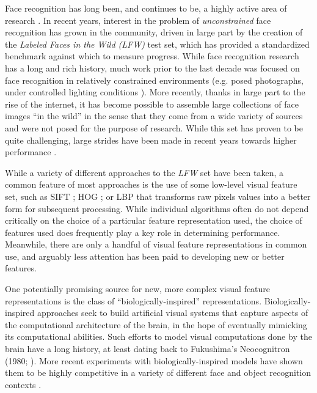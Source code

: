 Face recognition has long been, and continues to be, a highly active area of research \cite{belhumeur2002eigenfaces,yang2002kernel,vasilescu2002multilinear,zhao2003face,he2005face,hua2007face,hua2009robust,guillaumin2009you,hua2009robust,wright2009implicit,zou2007comparative}.
In recent years, interest in the problem of \emph{unconstrained} face
recognition has grown in the community, driven in large part by the creation of
the \emph{Labeled Faces in the Wild (LFW)} \cite{huang:lfw} test set, which has
provided a standardized benchmark against which to measure progress.  While
face recognition research  has a long and rich history, much
work prior to the last decade was focused on face recognition in relatively
constrained environments (e.g. posed photographs, under controlled  lighting
conditions \cite{orl,yale,cvl,ar,phillips2000feret,gross2009multi}).  More
recently, thanks in large part to the rise of the internet, it has become
possible to assemble large collections of face images ``in the wild'' in the
sense that they come from a wide variety of sources and were not posed for the
purpose of research.  While this set has proven to be quite challenging, large
strides have been made in recent years towards higher performance
\cite{pinto:eccv08,pinto:cvpr09,taigman:bmvc09,wolf:accv09,kumar:iccv09,cao2010face}.

While a variety of different approaches to the \emph{LFW} set have been taken,
a common feature of most approaches is the use of some low-level visual feature
set, such as SIFT \cite{sift,luo2007person}; HOG
\cite{dalal2005hog,albiol2008face}; or LBP
\cite{ahonen2004face,ahonen2006face} that transforms raw pixels values into a
better form for subsequent processing.  While individual algorithms often do
not depend critically on the choice of a particular feature representation
used, the choice of features used does frequently play a key role in
determining performance.  Meanwhile, there are only a handful of visual feature
representations in common use, and arguably less attention has been paid to
developing new or better features.

One potentially promising source for new, more complex visual feature representations is the
class of ``biologically-inspired'' representations.
Biologically-inspired approaches seek to build artificial visual 
systems that capture aspects of the computational architecture of the brain, in the hope of
eventually mimicking its computational abilities. Such efforts to model visual
computations done by the brain have a long history, at least dating back to
Fukushima's Neocognitron (1980; \cite{fukushima1980neocognitron}).  More recent
experiments with biologically-inspired models have shown them to be highly
competitive in a variety of different face and object recognition
contexts \cite{serre2007ror,mutch2008ocr,pinto:plos08,pinto:eccv08,jarrett-iccv-09}.


